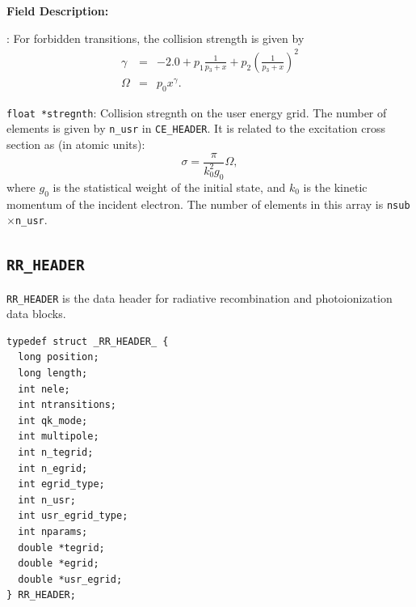 \documentclass[twoside,letterpaper]{refrep}
\newenvironment{dbdesc}{\textbf{Field Description:} \begin{list}
	{:}{\setlength{\labelwidth}{2in}
	   \setlength{\leftmargin}{2in}
	   \setlength{\labelsep}{0.1in}
	   \setlength{\rightmargin}{0.2in}}}
	{\end{list}}
\begin{document}
\begin{dbdesc}
For forbidden transitions, the collision strength is given by
\begin{eqnarray}
\gamma &=& -2.0 + p_1\frac{1}{p_3+x} + 
p_2\left(\frac{1}{p_3+x}\right)^2\nonumber\\
\Omega &=& p_0x^\gamma.
\end{eqnarray}
\item[\texttt{float *stregnth}:] Collision stregnth on the user energy
grid. The number of elements is given by \texttt{n\_usr} in
\texttt{CE\_HEADER}. It is related to the excitation cross section as (in
atomic units):
\begin{equation}
\sigma = \frac{\pi}{k_0^2g_0}\Omega,
\end{equation}
where $g_0$ is the statistical weight of the initial state, and $k_0$ is the
kinetic momentum of the incident electron. The number of elements in this
array is \texttt{nsub}$\times$\texttt{n\_usr}.
\end{dbdesc}

\subsection{\texttt{RR\_HEADER}}
\texttt{RR\_HEADER} is the data header for radiative recombination and
photoionization data blocks.

\begin{verbatim}
typedef struct _RR_HEADER_ {
  long position;
  long length;
  int nele;
  int ntransitions;
  int qk_mode;
  int multipole;
  int n_tegrid;
  int n_egrid;
  int egrid_type;
  int n_usr;
  int usr_egrid_type;
  int nparams;
  double *tegrid;
  double *egrid;
  double *usr_egrid;
} RR_HEADER;
\end{verbatim}
\end{document}
